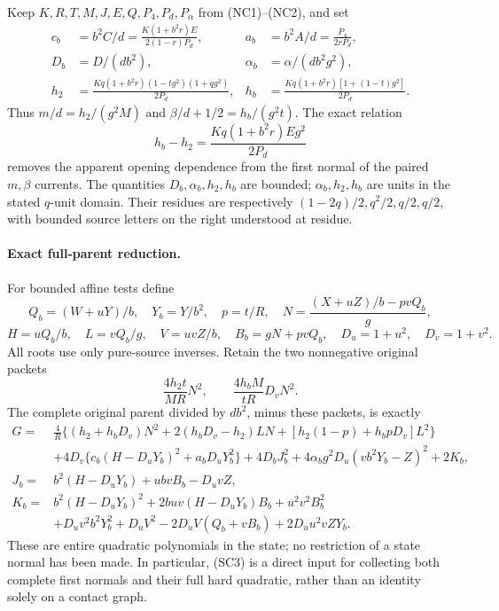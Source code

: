 Keep $K,R,T,M,J,E,Q,P_4,P_d,P_\alpha$ from (NC1)--(NC2), and set
\[
\begin{aligned}
 c_b&=b^2C/d=\frac{K(1+b^2r)E}{2(1-r)P_d},&
 a_b&=b^2A/d=\frac{P_4}{2rP_d},\\
 D_b&=D/(db^2),&\alpha_b&=\alpha/(db^2g^2),\\
 h_2&=\frac{Kq(1+b^2r)(1-tg^2)(1+qg^2)}{2P_d},&
 h_b&=\frac{Kq(1+b^2r)[1+(1-t)g^2]}{2P_d}.
\end{aligned}
\]
Thus $m/d=h_2/(g^2M)$ and $\beta/d+1/2=h_b/(g^2t)$.
The exact relation
\[
 h_b-h_2=\frac{Kq(1+b^2r)E g^2}{2P_d}
 \tag{SC2}
\]
removes the apparent opening dependence from the first normal of the
paired $m,\beta$ currents. The quantities $D_b,\alpha_b,h_2,h_b$ are
bounded; $\alpha_b,h_2,h_b$ are units in the stated $q$-unit domain.
Their residues are respectively $(1-2q)/2,q^2/2,q/2,q/2$, with
bounded source letters on the right understood at residue.

\paragraph{Exact full-parent reduction.}
For bounded affine tests define
\[
 Q_b=(W+uY)/b,\quad Y_b=Y/b^2,\quad p=t/R,\quad
 N=\frac{(X+uZ)/b-pvQ_b}{g},
\]
\[
 H=uQ_b/b,\quad L=vQ_b/g,\quad V=uvZ/b,\quad
 B_b=gN+pvQ_b,\quad D_u=1+u^2,\quad D_v=1+v^2.
\]
All roots use only pure-source inverses. Retain the two nonnegative
original packets
\[
 \frac{4h_2t}{MR}N^2,
 \qquad \frac{4h_bM}{tR}D_vN^2.
\]
The complete original parent divided by $db^2$, minus these packets,
is exactly
\begin{align*}
 G={}&\frac4R\{(h_2+h_bD_v)N^2+2(h_bD_v-h_2)LN
              +[h_2(1-p)+h_bpD_v]L^2\}\\
 &+4D_v\{c_b(H-D_uY_b)^2+a_bD_uY_b^2\}
   +4D_bJ_b^2+4\alpha_b g^2D_u(vb^2Y_b-Z)^2+2K_b,
                                                        \tag{SC3}\\
 J_b={}&b^2(H-D_uY_b)+ubvB_b-D_uvZ,\\
 K_b={}&b^2(H-D_uY_b)^2+2buv(H-D_uY_b)B_b+u^2v^2B_b^2\\
 &+D_uv^2b^2Y_b^2+D_uV^2
       -2D_uV(Q_b+vB_b)+2D_uu^2vZY_b.
\end{align*}
These are entire quadratic polynomials in the state; no restriction
of a state normal has been made. In particular, (SC3) is a direct
input for collecting both complete first normals and their full hard
quadratic, rather than an identity solely on a contact graph.

